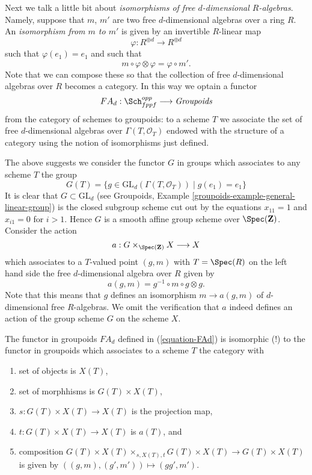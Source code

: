 \medskip\noindent
Next we talk a little bit about {\it isomorphisms of free $d$-dimensional
$R$-algebras}. Namely, suppose that $m$, $m'$ are two free $d$-dimensional
algebras over a ring $R$. An {\it isomorphism from $m$ to $m'$} is given by
an invertible $R$-linear map
$$
\varphi : R^{\oplus d} \longrightarrow R^{\oplus d}
$$
such that $\varphi(e_1) = e_1$ and such that
$$
m \circ \varphi \otimes \varphi = \varphi \circ m'.
$$
Note that we can compose these so that the collection of
free $d$-dimensional algebras over $R$ becomes a category.
In this way we optain a functor
\begin{equation}
\label{equation-FAd}
FA_d : \Sch_{fppf}^{opp} \longrightarrow \textit{Groupoids}
\end{equation}
from the category of schemes to groupoids: to a scheme $T$ we associate the
set of free $d$-dimensional algebras over $\Gamma(T, \mathcal{O}_T)$
endowed with the structure
of a category using the notion of isomorphisms just defined.

\medskip\noindent
The above suggests we consider the functor $G$ in groups
which associates to any scheme $T$ the group
$$
G(T) = \{g \in \text{GL}_d(\Gamma(T, \mathcal{O}_T)) \mid g(e_1) = e_1\}
$$
It is clear that $G \subset \text{GL}_d$ (see
Groupoids, Example \ref{groupoids-example-general-linear-group})
is the closed subgroup scheme cut out by the equations
$x_{11} = 1$ and $x_{i1} = 0$ for $i > 1$. Hence $G$ is a smooth
affine group scheme over $\Spec(\mathbf{Z})$. Consider the
action
$$
a : G \times_{\Spec(\mathbf{Z})} X \longrightarrow X
$$
which associates to a $T$-valued point $(g, m)$ with $T = \Spec(R)$
on the left hand side the free $d$-dimensional algebra over $R$
given by
$$
a(g, m) = g^{-1} \circ m \circ g \otimes g.
$$
Note that this means that $g$ defines an isomorphism $m \to a(g, m)$
of $d$-dimensional free $R$-algebras. We omit the verification that
$a$ indeed defines an action of the group scheme $G$ on the scheme $X$.

\begin{lemma}
\label{lemma-represent-FAd}
The functor in groupoids $FA_d$ defined in (\ref{equation-FAd})
is isomorphic (!) to the functor in groupoids which associates
to a scheme $T$ the category with
\begin{enumerate}
\item set of objects is $X(T)$,
\item set of morphhisms is $G(T) \times X(T)$,
\item $s : G(T) \times X(T) \to X(T)$ is the projection map,
\item $t : G(T) \times X(T) \to X(T)$ is $a(T)$, and
\item composition $G(T) \times X(T) \times_{s, X(T), t} G(T) \times X(T)
\to G(T) \times X(T)$ is given by $((g, m), (g', m')) \mapsto (gg', m')$.
\end{enumerate}
\end{lemma}

